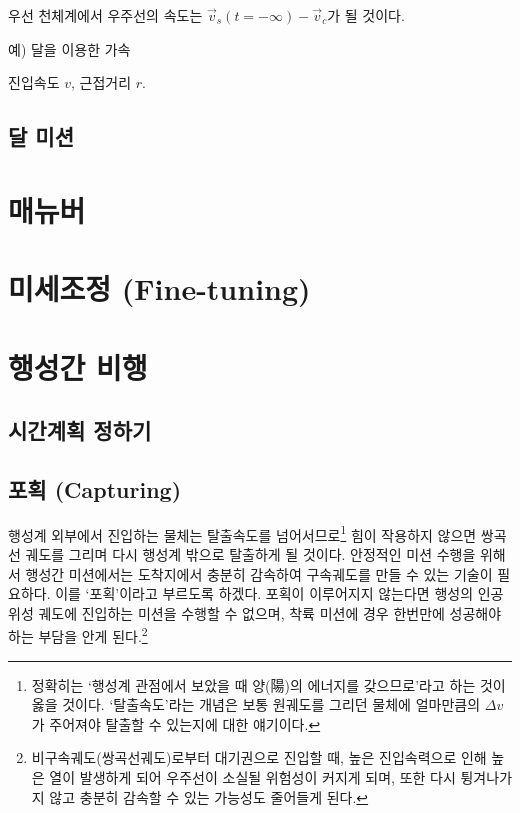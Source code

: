 \documentclass[10pt]{amsbook}
\begin{document}
우선 천체계에서 우주선의 속도는 $\vec{v}_s(t=-\infty)-\vec{v}_c$가 될 것이다.

예) 달을 이용한 가속

진입속도 $v$, 근접거리 $r$.

\chapter{달 미션}

\part{매뉴버}
\part{미세조정 (Fine-tuning)}
\part{행성간 비행}
\chapter{시간계획 정하기}
\chapter{포획 (Capturing)}
행성계 외부에서 진입하는 물체는 탈출속도를 넘어서므로\footnote{정확히는 `행성계 관점에서 보았을 때 양(陽)의 에너지를 갖으므로'라고 하는 것이 옳을 것이다. `탈출속도'라는 개념은 보통 원궤도를 그리던 물체에 얼마만큼의 $\Delta v$가 주어져야 탈출할 수 있는지에 대한 얘기이다.} 힘이 작용하지 않으면 쌍곡선 궤도를 그리며 다시 행성계 밖으로 탈출하게 될 것이다.
안정적인 미션 수행을 위해서 행성간 미션에서는 도착지에서 충분히 감속하여 구속궤도를 만들 수 있는 기술이 필요하다. 이를 `포획'이라고 부르도록 하겠다. 포획이 이루어지지 않는다면 행성의 인공위성 궤도에 진입하는 미션을 수행할 수 없으며, 착륙 미션에 경우 한번만에 성공해야 하는 부담을 안게 된다.\footnote{비구속궤도(쌍곡선궤도)로부터 대기권으로 진입할 때, 높은 진입속력으로 인해 높은 열이 발생하게 되어 우주선이 소실될 위험성이 커지게 되며, 또한 다시 튕겨나가지 않고 충분히 감속할 수 있는 가능성도 줄어들게 된다.}
\end{document}
